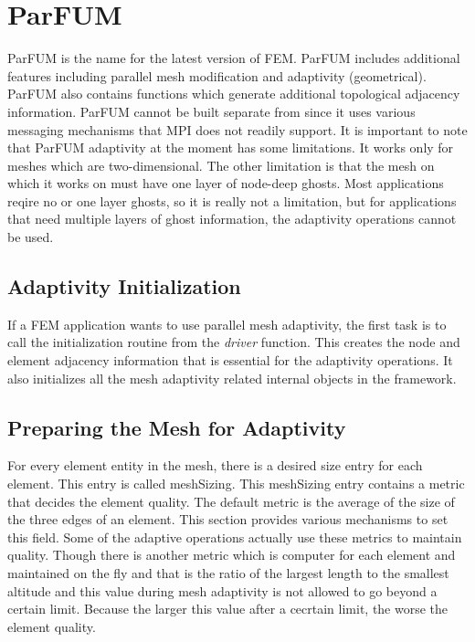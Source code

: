\section{ParFUM}
\label{sec:ParFUM}

ParFUM is the name for the latest version of FEM. 
ParFUM includes additional features including parallel 
mesh modification and adaptivity (geometrical).  ParFUM also contains 
functions which generate additional topological adjacency 
information.  ParFUM cannot be built separate from \charmpp{} 
since it uses various messaging mechanisms that MPI does 
not readily support. It is important to note that ParFUM adaptivity
at the moment has some limitations. It works only for meshes which 
are two-dimensional. The other limitation is that the mesh on which 
it works on must have one layer of node-deep ghosts. Most applications 
reqire no or one layer ghosts, so it is really not a limitation,
but for applications that need multiple layers of ghost information,
the adaptivity operations cannot be used.


\subsection{Adaptivity Initialization}
If a FEM application wants to use parallel mesh adaptivity,
the first task is to call the initialization routine from the 
{\it driver} function. This creates the node and element 
adjacency information that is essential for the adaptivity 
operations. It also initializes all the mesh adaptivity related
internal objects in the framework.





\subsection{Preparing the Mesh for Adaptivity}
For every element entity in the mesh, there is a desired size entry 
for each element. This entry is called meshSizing. This meshSizing entry 
contains a metric that decides the element quality. The default metric is
the average of the size of the three edges of an element. This section 
provides various mechanisms to set this field. Some of the adaptive operations
actually use these metrics to maintain quality. Though there is another metric
which is computer for each element and maintained on the fly and that 
is the ratio of the largest length to the smallest altitude and this value 
during mesh adaptivity is not allowed to go beyond a certain limit. Because
the larger this value after a cecrtain limit, the worse the element quality.

